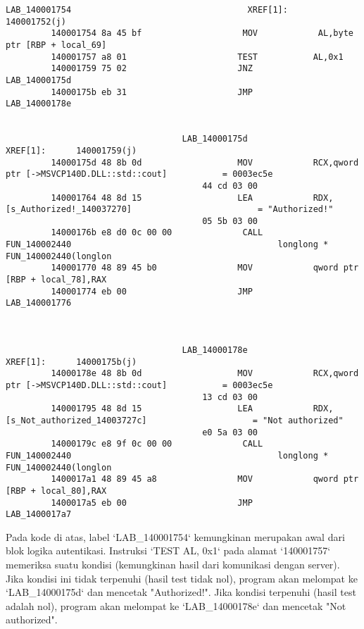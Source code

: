 \begin{verbatim}
LAB_140001754                                   XREF[1]:      140001752(j)
         140001754 8a 45 bf                    MOV            AL,byte ptr [RBP + local_69]
         140001757 a8 01                      TEST           AL,0x1
         140001759 75 02                      JNZ            LAB_14000175d
         14000175b eb 31                      JMP            LAB_14000178e


                                   LAB_14000175d                                   XREF[1]:      140001759(j)
         14000175d 48 8b 0d                   MOV            RCX,qword ptr [->MSVCP140D.DLL::std::cout]           = 0003ec5e
                                       44 cd 03 00
         140001764 48 8d 15                   LEA            RDX,[s_Authorized!_140037270]                         = "Authorized!"
                                       05 5b 03 00
         14000176b e8 d0 0c 00 00              CALL           FUN_140002440                                         longlong * FUN_140002440(longlon
         140001770 48 89 45 b0                MOV            qword ptr [RBP + local_78],RAX
         140001774 eb 00                      JMP            LAB_140001776



                                   LAB_14000178e                                   XREF[1]:      14000175b(j)
         14000178e 48 8b 0d                   MOV            RCX,qword ptr [->MSVCP140D.DLL::std::cout]           = 0003ec5e
                                       13 cd 03 00
         140001795 48 8d 15                   LEA            RDX,[s_Not_authorized_14003727c]                     = "Not authorized"
                                       e0 5a 03 00
         14000179c e8 9f 0c 00 00              CALL           FUN_140002440                                         longlong * FUN_140002440(longlon
         1400017a1 48 89 45 a8                MOV            qword ptr [RBP + local_80],RAX
         1400017a5 eb 00                      JMP            LAB_1400017a7
\end{verbatim}

Pada kode di atas, label `LAB\_140001754` kemungkinan merupakan awal dari blok logika autentikasi. Instruksi `TEST AL, 0x1` pada alamat `140001757` memeriksa suatu kondisi (kemungkinan hasil dari komunikasi dengan server). Jika kondisi ini tidak terpenuhi (hasil test tidak nol), program akan melompat ke `LAB\_14000175d` dan mencetak "Authorized!". Jika kondisi terpenuhi (hasil test adalah nol), program akan melompat ke `LAB\_14000178e` dan mencetak "Not authorized".

